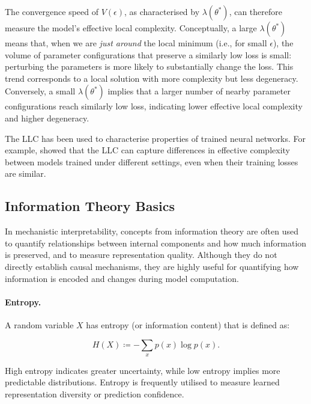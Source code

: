 The convergence speed of $V(\epsilon)$, as characterised by $\lambda(\theta^*)$, can therefore measure the model’s effective local complexity. Conceptually, a large $\lambda(\theta^*)$ means that, when we are \emph{just around} the local minimum (i.e., for small $\epsilon$), the volume of parameter configurations that preserve a similarly low loss is small: perturbing the parameters is more likely to substantially change the loss. This trend corresponds to a local solution with more complexity but less degeneracy. Conversely, a small $\lambda(\theta^*)$ implies that a larger number of nearby parameter configurations reach similarly low loss, indicating lower effective local complexity and higher degeneracy.

The LLC has been used to characterise properties of trained neural networks. For example,  showed that the LLC can capture differences in effective complexity between models trained under different settings, even when their training losses are similar.




















\subsection{Information Theory Basics}

In mechanistic interpretability, concepts from information theory are often used to quantify relationships between internal components and how much information is preserved, and to measure representation quality. Although they do not directly establish causal mechanisms, they are highly useful for quantifying how information is encoded and changes during model computation.

\paragraph{Entropy.} A random variable $X$ has entropy (or information content) that is defined as:

\[
H(X) \coloneqq -\sum_x p(x)\log p(x).
\]

High entropy indicates greater uncertainty, while low entropy implies more predictable distributions. Entropy is frequently utilised to measure learned representation diversity or prediction confidence.


